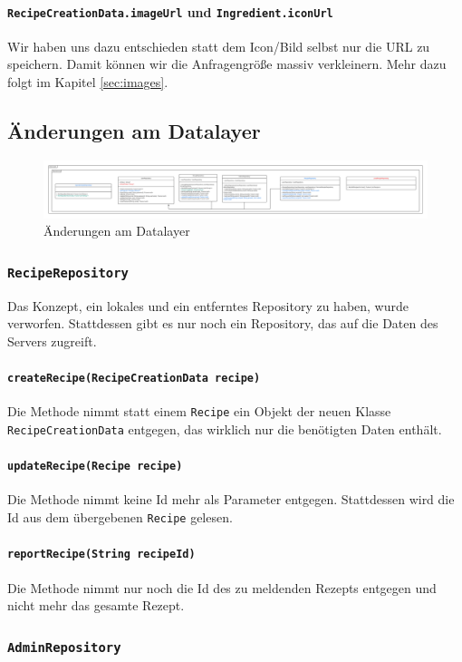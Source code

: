 \documentclass{implementierungsheft}
\begin{document}
\paragraph{\texttt{RecipeCreationData.imageUrl} und \texttt{Ingredient.iconUrl}} Wir haben uns dazu entschieden statt dem Icon/Bild selbst nur die URL zu speichern. Damit können wir die Anfragengröße massiv verkleinern. Mehr dazu folgt im Kapitel \ref{sec:images}.
\newpage
\subsection{Änderungen am Datalayer}
\begin{figure}[htp]
    \centering
    \includegraphics[width=\textwidth]{images/uml/dataLayer.pdf}
    \caption{Änderungen am Datalayer}
    \label{fig:dataLayer}
\end{figure}
\subsubsection{\texttt{RecipeRepository}}
Das Konzept, ein lokales und ein entferntes Repository zu haben, wurde verworfen. Stattdessen gibt es nur noch ein Repository, das auf die Daten des Servers zugreift.
\paragraph{\texttt{createRecipe(RecipeCreationData recipe)}} Die Methode nimmt statt einem \texttt{Recipe} ein Objekt der neuen Klasse \texttt{RecipeCreationData} entgegen, das wirklich nur die benötigten Daten enthält.
\paragraph{\texttt{updateRecipe(Recipe recipe)}} Die Methode nimmt keine Id mehr als Parameter entgegen. Stattdessen wird die Id aus dem übergebenen \texttt{Recipe} gelesen.
\paragraph{\texttt{reportRecipe(String recipeId)}} Die Methode nimmt nur noch die Id des zu meldenden Rezepts entgegen und nicht mehr das gesamte Rezept.
\subsubsection{\texttt{AdminRepository}}
\end{document}
